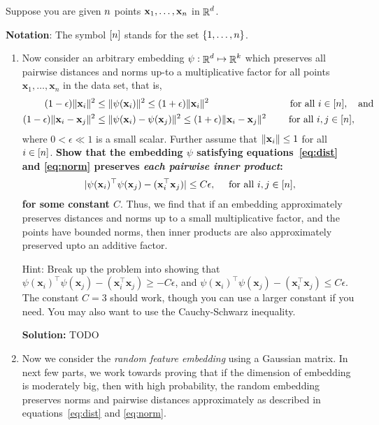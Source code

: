 \documentclass{article}
\DeclareMathOperator{\R}{\mathbb{R}}
\renewcommand{\vec}[1]{\boldsymbol{\mathbf{#1}}}
\newenvironment{solution}{\color{blue} \smallskip \textbf{Solution:}}{}
\begin{document}
Suppose you are given $n$ points $\vec x_1, \ldots, \vec x_\num$ in $\R^\dims$.

{\bf Notation}: The symbol $[n]$ stands for the set $\{1, \ldots, n\}$.


\begin{enumerate}

\item Now consider an arbitrary  embedding $\psi:\R^\dims \mapsto \R^k$ 
which preserves all pairwise distances and norms up-to a multiplicative factor for all points $\vec x_1,\dots,\vec x_n$ in the data set, 
that is,
\begin{align}
	(1-\epsilon) \Vert \vec x_i \Vert^2 &\leq \Vert \psi(\vec x_i) \Vert^2 \leq (1+\epsilon) \Vert \vec x_i \Vert^2 \quad &\text{ for all } i \in [\num], \quad\text{and} \label{eq:norm}\\
	(1-\epsilon) \Vert\vec x_i - \vec x_j \Vert^2 &\leq  \Vert \psi(\vec x_i) - \psi(\vec x_j) \Vert^2 
	\leq (1+\epsilon) \Vert\vec x_i - \vec x_j \Vert^2 \quad &\text{ for all } i, j \in [\num], \quad \quad \label{eq:dist}
\end{align}
where $0<\epsilon \ll 1$ is a small scalar.
Further assume that $\norm{\vec{x}_i} \leq 1$ for all $i \in [n]$.
{\bf Show that the embedding $\psi$ satisfying equations~\eqref{eq:dist} and \eqref{eq:norm} 
preserves \emph{each pairwise inner product}:}
\begin{align}
\label{eq:psi_iprod}
	\vert \psi(\vec x_i)^\top\psi(\vec x_j) - (\vec x_i^\top \vec x_j) \vert  \leq C\epsilon, \quad \text{ for all } i, j \in [\num],
\end{align}
{\bf for some constant $C$}.
Thus, we find that if an embedding  approximately preserves distances and norms up to a small multiplicative factor, 
and the points have bounded norms, then 
inner products are also approximately preserved upto an additive factor.


Hint: Break up the problem into showing that $\psi(\vec x_i)^\top\psi(\vec x_j) - (\vec x_i^\top \vec x_j) \ge -C\epsilon $, and $\psi(\vec x_i)^\top\psi(\vec x_j) - (\vec x_i^\top \vec x_j) \le C\epsilon$. The constant $C = 3$ should work, though you can use a larger constant if you need. You may also want to use the Cauchy-Schwarz inequality.

\begin{solution}
    TODO
\end{solution}

\newpage
\item Now we consider the \emph{random feature embedding} using a Gaussian matrix.
In next few parts, we work towards proving that if the dimension of embedding
is moderately big, then with high probability, the random embedding preserves norms and pairwise 
distances approximately as described in equations~\eqref{eq:dist} and \eqref{eq:norm}.


\end{enumerate}
\end{document}
